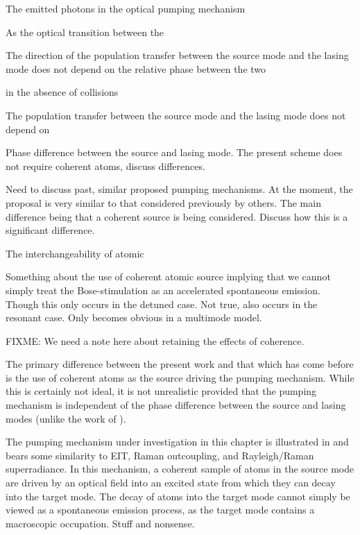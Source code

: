 The emitted photons in the optical pumping mechanism 




As the optical transition between the 


The direction of the population transfer between the source mode and the lasing mode does not depend on the relative phase between the two 

in the absence of collisions

The population transfer between the source mode and the lasing mode does not depend on 


Phase difference between the source and lasing mode. The present scheme does not require coherent atoms, discuss differences.

Need to discuss past, similar proposed pumping mechanisms.  At the moment, the proposal is very similar to that considered previously by others.  The main difference being that a coherent source is being considered.  Discuss how this is a significant difference.



The interchangeability of atomic 


Something about the use of coherent atomic source implying that we cannot simply treat the Bose-stimulation as an accelerated spontaneous emission.  Though this only occurs in the detuned case.  Not true, also occurs in the resonant case. Only becomes obvious in a multimode model.

FIXME:  We need a note here about retaining the effects of coherence.



The primary difference between the present work and that which has come before is the use of coherent atoms as the source driving the pumping mechanism.  While this is certainly not ideal, it is not unrealistic provided that the pumping mechanism is independent of the phase difference between the source and lasing modes (unlike the work of \citep{Savage:1998nx}).




The pumping mechanism under investigation in this chapter is illustrated in  and bears some similarity to EIT, Raman outcoupling, and Rayleigh/Raman superradiance.  In this mechanism, a coherent sample of atoms in the source mode are driven by an optical field into an excited state from which they can decay into the target mode.  The decay of atoms into the target mode cannot simply be viewed as a spontaneous emission process, as the target mode contains a macroscopic occupation.  Stuff and nonsense.


